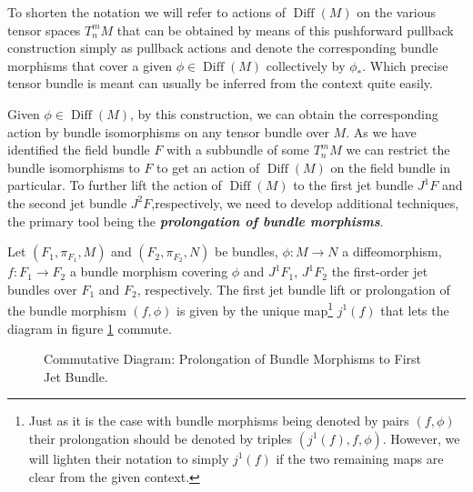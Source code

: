 To shorten the notation we will refer to actions of $\operatorname{Diff}(M)$ on the various tensor spaces $T^m_nM$ that can be obtained by means of this pushforward pullback construction simply as pullback actions and denote the corresponding bundle morphisms that cover a given $\phi \in \operatorname{Diff}(M)$ collectively by $\phi_{\ast}$. Which precise tensor bundle is meant can usually be inferred from the context quite easily.

Given $\phi \in \operatorname{Diff}(M)$, by this construction, we can obtain the corresponding action by bundle isomorphisms on any tensor bundle over $M$. As we have identified the field bundle $F$ with a subbundle of some $T^m_nM$ we can restrict the bundle isomorphisms to $F$ to get an action of $\operatorname{Diff}(M)$ on the field bundle in particular. 
To further lift the action of $\operatorname{Diff}(M)$ to the first jet bundle $J^1F$ and the second jet bundle $J^2F$,respectively, we need to develop additional techniques, the primary tool being the \textbf{\textit{prolongation of bundle morphisms}}. 
\begin{definition}
Let $(F_1,\pi_{F_1},M)$ and $(F_2,\pi_{F_2},N)$ be bundles, $\phi : M \rightarrow N$ a diffeomorphism, $f : F_1 \rightarrow F_2$ a bundle morphism covering $\phi$ and $J^1F_1$, $J^1F_2$ the first-order jet bundles over $F_1$ and $F_2$, respectively. The first jet bundle lift or prolongation of the bundle morphism $(f,\phi)$ is given by the unique map\footnote{Just as it is the case with bundle morphisms being denoted by pairs $(f,\phi)$ their prolongation should be denoted by triples $(j^1(f),f,\phi)$. However, we will lighten their notation to simply $j^1(f)$ if the two remaining maps are clear from the given context.} $j^1(f)$ that lets the diagram in figure \ref{ProlongMorph} commute.
\begin{figure}[hbt!]
\centering
{}
\caption{Commutative Diagram: Prolongation of Bundle Morphisms to First Jet Bundle.}\label{ProlongMorph}
\end{figure}
\end{definition}
